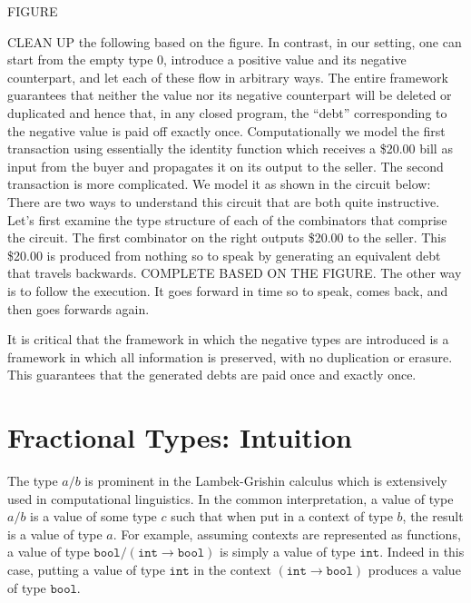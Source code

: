 \documentclass[preprint]{sigplanconf}
\begin{document}
FIGURE

CLEAN UP the following based on the figure. In contrast, in our setting, one
can start from the empty type $0$, introduce a positive value and its
negative counterpart, and let each of these flow in arbitrary ways. The
entire framework guarantees that neither the value nor its negative
counterpart will be deleted or duplicated and hence that, in any closed
program, the ``debt'' corresponding to the negative value is paid off exactly
once. Computationally we model the first transaction using essentially the
identity function which receives a \$20.00 bill as input from the buyer and
propagates it on its output to the seller. The second transaction is more
complicated. We model it as shown in the circuit below: There are two ways to
understand this circuit that are both quite instructive. Let's first examine
the type structure of each of the combinators that comprise the circuit. The
first combinator on the right outputs \$20.00 to the seller. This \$20.00 is
produced from nothing so to speak by generating an equivalent debt that
travels backwards. COMPLETE BASED ON THE FIGURE. The other way is to follow
the execution. It goes forward in time so to speak, comes back, and then goes
forwards again.

It is critical that the framework in which the negative types are introduced
is a framework in which all information is preserved, with no duplication or
erasure. This guarantees that the generated debts are paid once and exactly
once.

\section{Fractional Types: Intuition} 

The type $a/b$ is prominent in the Lambek-Grishin calculus which is
extensively used in computational linguistics. In the common interpretation,
a value of type $a/b$ is a value of some type $c$ such that when put in a
context of type $b$, the result is a value of type $a$. For example, assuming
contexts are represented as functions, a value of type $\texttt{bool} /
(\texttt{int} \rightarrow \texttt{bool})$ is simply a value of type
$\texttt{int}$. Indeed in this case, putting a value of type $\texttt{int}$
in the context $(\texttt{int} \rightarrow \texttt{bool})$ produces a value of
type $\texttt{bool}$. 
\end{document}
